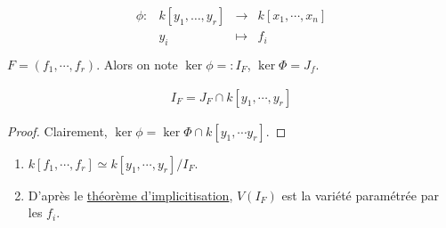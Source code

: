         \begin{nota}
            \begin{align*}
                \begin{array}{cccc}
                    \phi : & k[y_1, \dots, y_r] & \to & k[x_1, \cdots, x_n] \\
                    & y_i & \mapsto & f_i \\
                \end{array}
            \end{align*}
            $F = (f_1, \cdots, f_r)$. Alors on note $\ker \phi =: I_F$, $\ker \Phi = J_f$.
        \end{nota}
        \begin{prop}
            \begin{align*}
                I_F = J_F \cap k[y_1, \cdots, y_r]
            \end{align*}
        \end{prop}
        \begin{proof}
            Clairement, $\ker \phi = \ker \Phi \cap k[y_1, \cdots y_r]$.
        \end{proof}
        \begin{remq}
            \begin{enumerate}
            \item $k[f_1, \cdots, f_r] \simeq k[y_1, \cdots, y_r]/I_F$. 
            \item D'après le \hyperref[implicitisation]{théorème d'implicitisation}, $V(I_F)$ est la variété paramétrée par les $f_i$.
            \end{enumerate}
        \end{remq}

